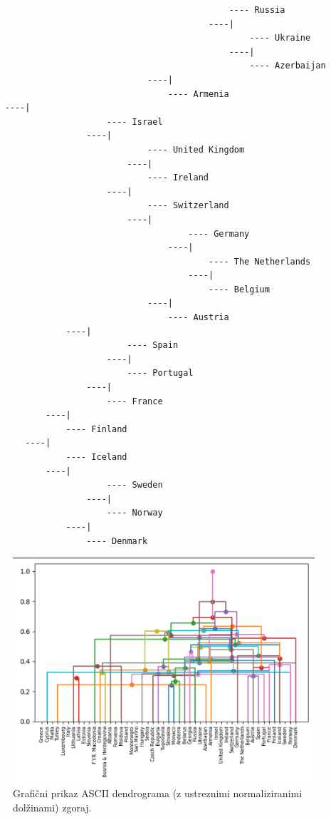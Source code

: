 \documentclass[a4paper,11pt]{article}
\begin{document}
\begin{lstlisting}
                                                ---- Russia
                                            ----|
                                                    ---- Ukraine
                                                ----|
                                                    ---- Azerbaijan
                                ----|
                                    ---- Armenia
    ----|
                        ---- Israel
                    ----|
                                ---- United Kingdom
                            ----|
                                ---- Ireland
                        ----|
                                ---- Switzerland
                            ----|
                                        ---- Germany
                                    ----|
                                            ---- The Netherlands
                                        ----|
                                            ---- Belgium
                                ----|
                                    ---- Austria
                ----|
                            ---- Spain
                        ----|
                            ---- Portugal
                    ----|
                        ---- France
            ----|
                ---- Finland
        ----|
                ---- Iceland
            ----|
                        ---- Sweden
                    ----|
                        ---- Norway
                ----|
                    ---- Denmark
\end{lstlisting}

\begin{figure}[h!]
\begin{center}
\includegraphics[scale=0.45]{graphical.png}
\caption{Grafični prikaz ASCII dendrograma (z ustreznimi normaliziranimi dolžinami) zgoraj.}
\label{slika3}
\end{center}
\end{figure}
\end{document}
